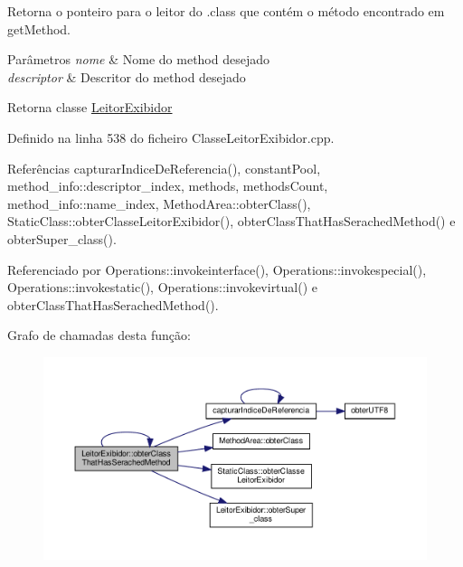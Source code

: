 Retorna o ponteiro para o leitor do .class que contém o método encontrado em get\+Method. 


\begin{DoxyParams}{Parâmetros}
{\em nome} & Nome do method desejado \\
\hline
{\em descriptor} & Descritor do method desejado \\
\hline
\end{DoxyParams}
\begin{DoxyReturn}{Retorna}
classe \hyperlink{classLeitorExibidor}{Leitor\+Exibidor} 
\end{DoxyReturn}


Definido na linha 538 do ficheiro Classe\+Leitor\+Exibidor.\+cpp.



Referências capturar\+Indice\+De\+Referencia(), constant\+Pool, method\+\_\+info\+::descriptor\+\_\+index, methods, methods\+Count, method\+\_\+info\+::name\+\_\+index, Method\+Area\+::obter\+Class(), Static\+Class\+::obter\+Classe\+Leitor\+Exibidor(), obter\+Class\+That\+Has\+Serached\+Method() e obter\+Super\+\_\+class().



Referenciado por Operations\+::invokeinterface(), Operations\+::invokespecial(), Operations\+::invokestatic(), Operations\+::invokevirtual() e obter\+Class\+That\+Has\+Serached\+Method().

Grafo de chamadas desta função\+:
\nopagebreak
\begin{figure}[H]
\begin{center}
\leavevmode
\includegraphics[width=350pt]{classLeitorExibidor_a3893e9478688cf21b293536da48f9f14_cgraph}
\end{center}
\end{figure}
\mbox{\label{classLeitorExibidor_a58636f719aebaaa46524233b94b46537}} 
